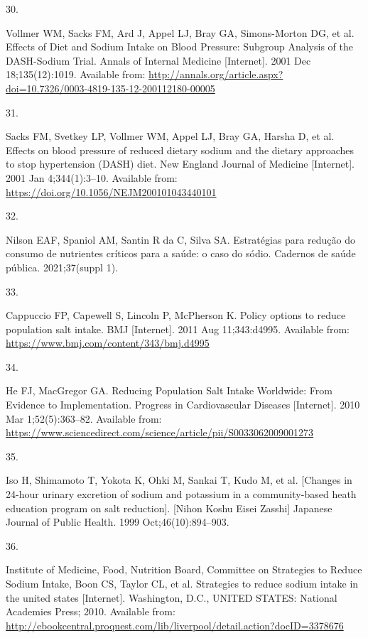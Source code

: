 \documentclass[
]{article}
\newlength{\cslhangindent}
\newlength{\csllabelwidth}
\newlength{\cslentryspacingunit} %
\newenvironment{CSLReferences}[2] %
 {%
  \setlength{\parindent}{0pt}
  \ifodd #1
  \let\oldpar\par
  \def\par{\hangindent=\cslhangindent\oldpar}
  \fi
  \setlength{\parskip}{#2\cslentryspacingunit}
 }%
 {}
\newcommand{\CSLLeftMargin}[1]{\parbox[t]{\csllabelwidth}{#1}}
\newcommand{\CSLRightInline}[1]{\parbox[t]{\linewidth - \csllabelwidth}{#1}\break}
\begin{document}
\begin{CSLReferences}{0}{0}
\leavevmode{}%
\CSLLeftMargin{30. }%
\CSLRightInline{Vollmer WM, Sacks FM, Ard J, Appel LJ, Bray GA,
Simons-Morton DG, et al. Effects of Diet and Sodium Intake on Blood
Pressure: Subgroup Analysis of the DASH-Sodium Trial. Annals of Internal
Medicine {[}Internet{]}. 2001 Dec 18;135(12):1019. Available from:
\url{http://annals.org/article.aspx?doi=10.7326/0003-4819-135-12-200112180-00005}}

\leavevmode{}%
\CSLLeftMargin{31. }%
\CSLRightInline{Sacks FM, Svetkey LP, Vollmer WM, Appel LJ, Bray GA,
Harsha D, et al. Effects on blood pressure of reduced dietary sodium and
the dietary approaches to stop hypertension (DASH) diet. New England
Journal of Medicine {[}Internet{]}. 2001 Jan 4;344(1):3--10. Available
from: \url{https://doi.org/10.1056/NEJM200101043440101}}

\leavevmode{}%
\CSLLeftMargin{32. }%
\CSLRightInline{Nilson EAF, Spaniol AM, Santin R da C, Silva SA.
Estratégias para redução do consumo de nutrientes críticos para a saúde:
o caso do sódio. Cadernos de saúde pública. 2021;37(suppl 1). }

\leavevmode{}%
\CSLLeftMargin{33. }%
\CSLRightInline{Cappuccio FP, Capewell S, Lincoln P, McPherson K. Policy
options to reduce population salt intake. BMJ {[}Internet{]}. 2011 Aug
11;343:d4995. Available from:
\url{https://www.bmj.com/content/343/bmj.d4995}}

\leavevmode{}%
\CSLLeftMargin{34. }%
\CSLRightInline{He FJ, MacGregor GA. Reducing Population Salt Intake
Worldwide: From Evidence to Implementation. Progress in Cardiovascular
Diseases {[}Internet{]}. 2010 Mar 1;52(5):363--82. Available from:
\url{https://www.sciencedirect.com/science/article/pii/S0033062009001273}}

\leavevmode{}%
\CSLLeftMargin{35. }%
\CSLRightInline{Iso H, Shimamoto T, Yokota K, Ohki M, Sankai T, Kudo M,
et al. {[}Changes in 24-hour urinary excretion of sodium and potassium
in a community-based heath education program on salt reduction{]}.
{[}Nihon Koshu Eisei Zasshi{]} Japanese Journal of Public Health. 1999
Oct;46(10):894--903. }

\leavevmode{}%
\CSLLeftMargin{36. }%
\CSLRightInline{Institute of Medicine, Food, Nutrition Board, Committee
on Strategies to Reduce Sodium Intake, Boon CS, Taylor CL, et al.
Strategies to reduce sodium intake in the united states {[}Internet{]}.
Washington, D.C., UNITED STATES: National Academies Press; 2010.
Available from:
\url{http://ebookcentral.proquest.com/lib/liverpool/detail.action?docID=3378676}}


\end{CSLReferences}
\end{document}
